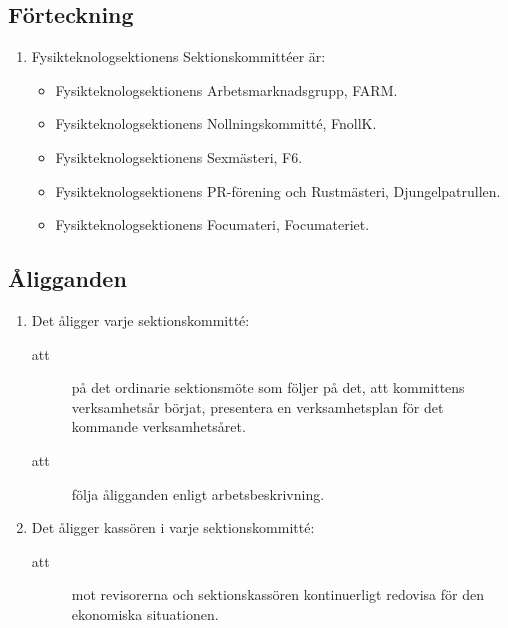 \documentclass[11pt,a4paper]{article}
\begin{document}
\subsection{Förteckning}

\begin{enumerate}[\thesubsection .1]
  \item Fysikteknologsektionens Sektionskommittéer är:
    \begin{itemize}
      \item Fysikteknologsektionens Arbetsmarknadsgrupp, FARM.
      \item Fysikteknologsektionens Nollningskommitté, FnollK.
      \item Fysikteknologsektionens Sexmästeri, F6.
      \item Fysikteknologsektionens PR-förening och Rustmästeri, Djungelpatrullen.
      \item Fysikteknologsektionens Focumateri, Focumateriet. 
    \end{itemize}
\end{enumerate}

\subsection{Åligganden}

\begin{enumerate}[\thesubsection .1]

  \item Det åligger varje sektionskommitté:
    \begin{description}
    \item[att] på det ordinarie sektionsmöte som följer på det, att kommittens verksamhetsår börjat, presentera en verksamhetsplan för det kommande verksamhetsåret.     
     \item[att] följa åligganden enligt arbetsbeskrivning. 
    \end{description}


  \item Det åligger kassören i varje sektionskommitté:
    \begin{description}
      \item[att]  mot revisorerna och sektionskassören kontinuerligt redovisa för den ekonomiska situationen.
       \end{description}
\end{enumerate}
\end{document}
